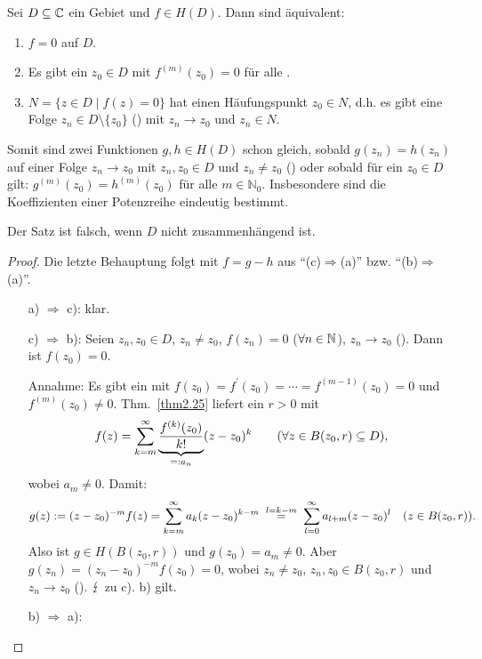 \documentclass[a4paper,twoside,DIV15,BCOR12mm]{scrbook}
\begin{document}
\begin{thm}[Identitätssatz]\label{thm2.35}
  Sei $D\subseteq\mathbb{C}$ ein Gebiet und $f\in H(D)$. Dann sind äquivalent:
  \begin{enumerate}
  \item $f=0$ auf $D$.
  \item Es gibt ein $z_0\in D$ mit $f^{(m)}(z_0)=0$ für alle .
  \item $N=\{ z\in D \mid f(z)=0 \}$ hat einen Häufungspunkt $z_0\in N$, d.h. es gibt eine Folge $z_n\in D\setminus\{z_0\}$
    () mit $z_n\to z_0$ und $z_n\in N$.
  \end{enumerate}
  Somit sind zwei Funktionen $g,h\in H(D)$ schon gleich, sobald $g(z_n)=h(z_n)$ auf einer Folge $z_n\to z_0$ mit $z_n,z_0\in D$
  und $z_n\neq z_0$ () oder sobald für ein $z_0\in D$ gilt: $g^{(m)}(z_0)=h^{(m)}(z_0)$ für alle
  $m\in\mathbb{N}_0$. Insbesondere sind die Koeffizienten einer Potenzreihe eindeutig bestimmt.
\end{thm}
\begin{bem*}
  Der Satz ist falsch, wenn $D$ nicht zusammenhängend ist.
\end{bem*}
\begin{proof}
  Die letzte Behauptung folgt mit $f=g-h$ aus "`(c)$\Rightarrow$(a)"' bzw. "`(b)$\Rightarrow$(a)"'.
  \begin{enumerate}
  \item[a)]$\!\Rightarrow$ c): klar.
  \item[c)]$\!\Rightarrow$ b): Seien $z_n,z_0\in D$, $z_n\neq z_0$, $f(z_n)=0$ ($\forall n\in\mathbb{N}$), $z_n\to z_0$ (\ninf). Dann
    ist $f(z_0) = 0$.

    Annahme: Es gibt ein  mit $f(z_0)=f^\prime(z_0)=\dotsb=f^{(m-1)}(z_0)=0$ und $f^{(m)}(z_0)\neq0$. Thm.~\ref{thm2.25}
    liefert ein $r>0$ mit
    \[ f(z)=\sum_{k=m}^\infty{\underbrace{\frac{f^{(k)}(z_0)}{k!}}_{=:a_n}(z-z_0)^k}\qquad(\forall z\in B(z_0,r)\subseteq D),\]
    wobei $a_m\neq0$. Damit:
    \[ g(z) \da (z-z_0)^{-m}f(z) = \sum_{k=m}^\infty{a_k(z-z_0)^{k-m}} \wegen{=}{l=k-m} \sum_{l=0}^\infty{a_{l+m}(z-z_0)^l}
    \quad (z\in B(z_0,r)).\]
    Also ist $g\in H(B(z_0,r))$ und $g(z_0)=a_m\neq0$. Aber $g(z_n)=(z_n-z_0)^{-m}f(z_0)=0$, wobei $z_n\neq z_0$, $z_n,z_0\in
    B(z_0,r)$ und $z_n\to z_0$ (\ninf). $\lightning$ zu c). \folgt b) gilt.
  \item[b)]$\!\Rightarrow$ a): \qedhere
  \end{enumerate}
\end{proof}
\end{document}
